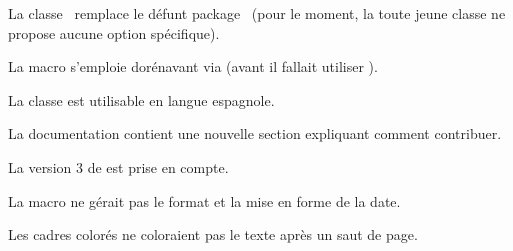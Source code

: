 \documentclass[12pt, a4paper]{article}
\begin{document}
\begin{tdocbreak}
    \item La classe \thisproj\ remplace le défunt package \thisproj\ (pour le moment, la toute jeune classe ne propose aucune option spécifique).

    \item La macro  s'emploie dorénavant via  (avant il fallait utiliser ).
\end{tdocbreak}


\begin{tdocnew}
    \item La classe est utilisable en langue espagnole.

    \item La documentation contient une nouvelle section expliquant comment contribuer.
\end{tdocnew}


\begin{tdocfix}
    \item La version 3 de  est prise en compte.

    \item La macro  ne gérait pas le format et la mise en forme de la date.

    \item Les cadres colorés ne coloraient pas le texte après un saut de page.
\end{tdocfix}
\end{document}
